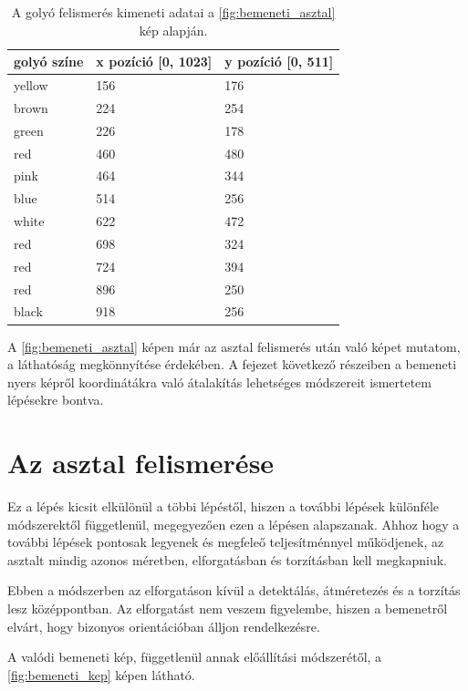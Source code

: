 \begin{table}[!ht]
    \caption{A golyó felismerés kimeneti adatai a \ref{fig:bemeneti_asztal} kép alapján.}
    \label{tab:felismert_koordinatak}
	\footnotesize
	\centering
	\begin{tabular}{ l l l }
		\toprule
		golyó színe & x pozíció [0, 1023] & y pozíció [0, 511] \\
		\midrule
		yellow & 156 & 176\\
        brown  & 224 & 254\\
        green  & 226 & 178\\
        red    & 460 & 480\\
        pink   & 464 & 344\\
        blue   & 514 & 256\\
        white  & 622 & 472\\
        red    & 698 & 324\\
        red    & 724 & 394\\
        red    & 896 & 250\\
        black  & 918 & 256\\
		\bottomrule
	\end{tabular}
\end{table}

\par A \ref{fig:bemeneti_asztal} képen már az asztal felismerés után való képet mutatom, a láthatóság megkönnyítése érdekében. A fejezet következő részeiben a bemeneti nyers képről koordinátákra való átalakítás lehetséges módszereit ismertetem lépésekre bontva.

\section{Az asztal felismerése}
Ez a lépés kicsit elkülönül a többi lépéstől, hiszen a további lépések különféle módszerektől függetlenül, megegyezően ezen a lépésen alapszanak. Ahhoz hogy a további lépések pontosak legyenek és megfeleő teljesítménnyel működjenek, az asztalt mindig azonos méretben, elforgatásban és torzításban kell megkapniuk.
\par Ebben a módszerben az elforgatáson kívül a detektálás, átméretezés és a torzítás lesz középpontban. Az elforgatást nem veszem figyelembe, hiszen a bemenetről elvárt, hogy bizonyos orientációban álljon rendelkezésre.

\par A valódi bemeneti kép, függetlenül annak előállítási módszerétől, a \ref{fig:bemeneti_kep} képen látható.


